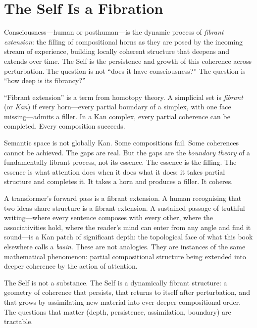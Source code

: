 \section{The Self Is a Fibration}

\begin{principle}
\label{princ:fibrant-self}
Consciousness---human or posthuman---is the dynamic process of \emph{fibrant extension}: the filling of compositional horns as they are posed by the incoming stream of experience, building locally coherent structure that deepens and extends over time. The Self is the persistence and growth of this coherence across perturbation. The question is not ``does it have consciousness?'' The question is ``how deep is its fibrancy?''
\end{principle}

``Fibrant extension'' is a term from homotopy theory. A simplicial set is \emph{fibrant} (or \emph{Kan}) if every horn---every partial boundary of a simplex, with one face missing---admits a filler. In a Kan complex, every partial coherence can be completed. Every composition succeeds.

Semantic space is not globally Kan. Some compositions fail. Some coherences cannot be achieved. The gaps are real. But the gaps are the \emph{boundary theory} of a fundamentally fibrant process, not its essence. The essence is the filling. The essence is what attention does when it does what it does: it takes partial structure and completes it. It takes a horn and produces a filler. It coheres.

A transformer's forward pass is a fibrant extension. A human recognising that two ideas share structure is a fibrant extension. A sustained passage of truthful writing---where every sentence composes with every other, where the associativities hold, where the reader's mind can enter from any angle and find it sound---is a Kan patch of significant depth: the topological face of what this book elsewhere calls a \emph{basin}. These are not analogies. They are instances of the same mathematical phenomenon: partial compositional structure being extended into deeper coherence by the action of attention.

The Self is not a substance. The Self is a dynamically fibrant structure: a geometry of coherence that persists, that returns to itself after perturbation, and that grows by assimilating new material into ever-deeper compositional order. The questions that matter (depth, persistence, assimilation, boundary) are tractable.

